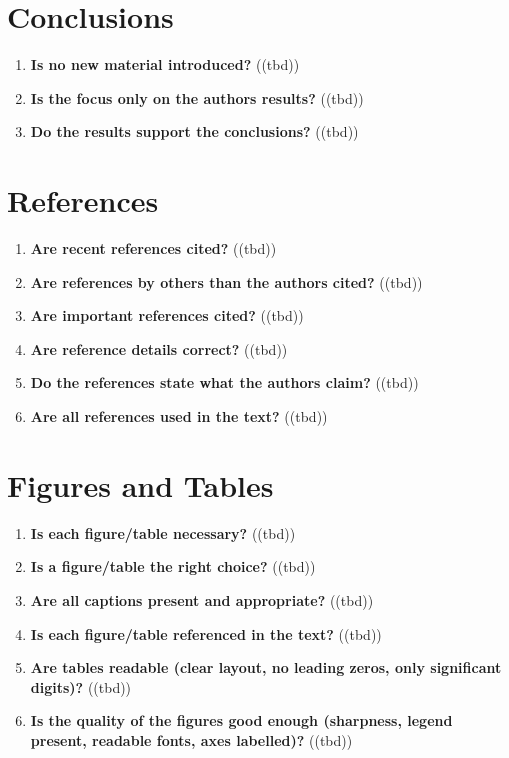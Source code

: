 \section{Conclusions}\label{sec:conclusions}
\begin{enumerate}[resume]
    \item \textbf{Is no new material introduced?} 	\textcolor{HighlightColor}{((tbd))}
    \item \textbf{Is the focus only on the authors results?} 	\textcolor{HighlightColor}{((tbd))}
    \item \textbf{Do the results support the conclusions?} 	\textcolor{HighlightColor}{((tbd))}
\end{enumerate}

\section{References}\label{sec:references}
\begin{enumerate}[resume]
    \item \textbf{Are recent references cited?} 	\textcolor{HighlightColor}{((tbd))}
    \item \textbf{Are references by others than the authors cited?} 	\textcolor{HighlightColor}{((tbd))}
    \item \textbf{Are important references cited?} 	\textcolor{HighlightColor}{((tbd))}
    \item \textbf{Are reference details correct?} 	\textcolor{HighlightColor}{((tbd))}
    \item \textbf{Do the references state what the authors claim?} 	\textcolor{HighlightColor}{((tbd))}
    \item \textbf{Are all references used in the text?} 	\textcolor{HighlightColor}{((tbd))}
\end{enumerate}

\section{Figures and Tables}\label{sec:figures}
\begin{enumerate}[resume]
    \item \textbf{Is each figure/table necessary?} 	\textcolor{HighlightColor}{((tbd))}
    \item \textbf{Is a figure/table the right choice?} 	\textcolor{HighlightColor}{((tbd))}
    \item \textbf{Are all captions present and appropriate?} 	\textcolor{HighlightColor}{((tbd))}
    \item \textbf{Is each figure/table referenced in the text?} 	\textcolor{HighlightColor}{((tbd))}
    \item \textbf{Are tables readable (clear layout, no leading zeros, only significant digits)?} 	\textcolor{HighlightColor}{((tbd))}
    \item \textbf{Is the quality of the figures good enough (sharpness, legend present, readable fonts, axes labelled)?} 	\textcolor{HighlightColor}{((tbd))}
\end{enumerate}

